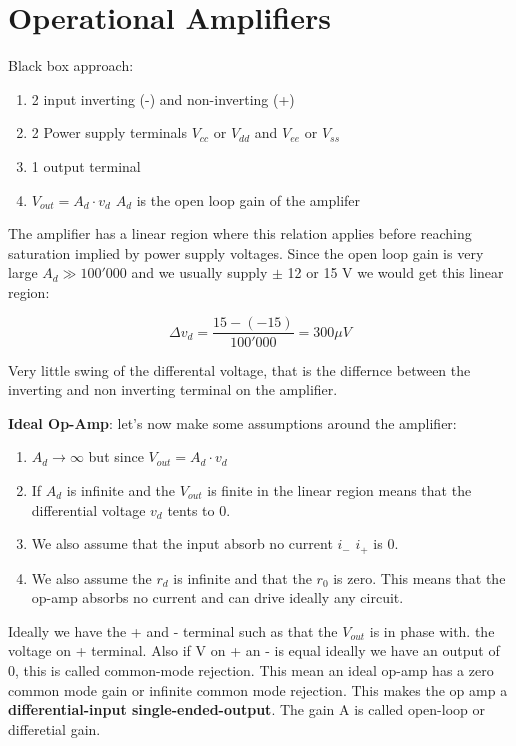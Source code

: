 \documentclass[../main.tex]{subfiles}
\begin{document}

\newpage
\section{Operational Amplifiers}

Black box approach:

\begin{enumerate}[label=\textbf{-}]
	\item 2 input inverting (-) and non-inverting (+)
	\item 2 Power supply terminals $V_{cc}$ or $V_{dd}$ and $V_{ee}$ or $V_{ss}$ 
	\item 1 output terminal
	\item $V_{out} = A_d  \cdot v_d$ $A_d$ is the open loop gain of the amplifer
\end{enumerate}

The amplifier has a linear region where this relation applies before reaching saturation implied by power supply voltages. Since the open loop gain is very large $A_d \gg 100'000$ and we usually supply $\pm$ 12 or 15 V we would get this linear region:

\begin{equation}
	\Delta v_d = \frac{15 - (-15)}{100'000} = 300 \mu V
\end{equation}

Very little swing of the differental voltage, that is the differnce between the inverting and non inverting terminal on the amplifier.


\textbf{Ideal Op-Amp}: let's now make some assumptions around the amplifier:

\begin{enumerate}[label=\textbf{-}]
	\item $A_d \rightarrow \infty$ but since $V_{out} = A_d \cdot v_d$
	\item If $A_d$ is infinite and the $V_{out}$ is finite in the linear region means that the differential voltage $v_d$ tents to 0.
	\item We also assume that the input absorb no current $i_-$ $i_+$ is 0.
	\item We also assume the $r_d$ is infinite and that the $r_0$ is zero. This means that the op-amp absorbs no current and can drive ideally any circuit.
 \end{enumerate}


Ideally we have the + and - terminal such as that the $V_{out}$ is in phase with. the voltage on + terminal. Also if V on + an - is equal ideally we have an output of 0, this is called common-mode rejection. This mean an ideal op-amp has a zero common mode gain or infinite common mode rejection. This makes the op amp a \textbf{differential-input single-ended-output}. The gain A is called open-loop or differetial gain.\\
\end{document}
